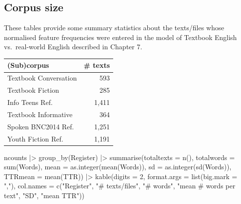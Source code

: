 \documentclass[
  letterpaper,
  DIV=11,
  numbers=noendperiod]{scrreprt}
\newenvironment{Shaded}{\begin{snugshade}}{\end{snugshade}}
\newcommand{\AttributeTok}[1]{\textcolor[rgb]{0.40,0.45,0.13}{#1}}
\newcommand{\DecValTok}[1]{\textcolor[rgb]{0.68,0.00,0.00}{#1}}
\newcommand{\FunctionTok}[1]{\textcolor[rgb]{0.28,0.35,0.67}{#1}}
\newcommand{\NormalTok}[1]{\textcolor[rgb]{0.00,0.23,0.31}{#1}}
\newcommand{\SpecialCharTok}[1]{\textcolor[rgb]{0.37,0.37,0.37}{#1}}
\newcommand{\StringTok}[1]{\textcolor[rgb]{0.13,0.47,0.30}{#1}}
\begin{document}
\subsection{Corpus size}\label{corpus-size-1}

These tables provide some summary statistics about the texts/files whose
normalised feature frequencies were entered in the model of Textbook
English vs.~real-world English described in Chapter 7.

\begin{Shaded}
\end{Shaded}

\begin{longtable}[]{@{}lr@{}}
\toprule\noalign{}
(Sub)corpus & \# texts \\
\midrule\noalign{}
\endhead
\bottomrule\noalign{}
\endlastfoot
Textbook Conversation & 593 \\
Textbook Fiction & 285 \\
Info Teens Ref. & 1,411 \\
Textbook Informative & 364 \\
Spoken BNC2014 Ref. & 1,251 \\
Youth Fiction Ref. & 1,191 \\
\end{longtable}

\begin{Shaded}
\begin{Highlighting}[]
\NormalTok{ncounts  }\SpecialCharTok{|\textgreater{}}  
  \FunctionTok{group\_by}\NormalTok{(Register) }\SpecialCharTok{|\textgreater{}}  
  \FunctionTok{summarise}\NormalTok{(}\AttributeTok{totaltexts =} \FunctionTok{n}\NormalTok{(), }
            \AttributeTok{totalwords =} \FunctionTok{sum}\NormalTok{(Words), }
            \AttributeTok{mean =} \FunctionTok{as.integer}\NormalTok{(}\FunctionTok{mean}\NormalTok{(Words)), }
            \AttributeTok{sd =} \FunctionTok{as.integer}\NormalTok{(}\FunctionTok{sd}\NormalTok{(Words)), }
            \AttributeTok{TTRmean =} \FunctionTok{mean}\NormalTok{(TTR)) }\SpecialCharTok{|\textgreater{}}  
  \FunctionTok{kable}\NormalTok{(}\AttributeTok{digits =} \DecValTok{2}\NormalTok{, }
        \AttributeTok{format.args =} \FunctionTok{list}\NormalTok{(}\AttributeTok{big.mark =} \StringTok{","}\NormalTok{),}
        \AttributeTok{col.names =} \FunctionTok{c}\NormalTok{(}\StringTok{"Register"}\NormalTok{, }\StringTok{"\# texts/files"}\NormalTok{, }\StringTok{"\# words"}\NormalTok{, }\StringTok{"mean \# words per text"}\NormalTok{, }\StringTok{"SD"}\NormalTok{, }\StringTok{"mean TTR"}\NormalTok{))}
\end{Highlighting}
\end{Shaded}
\end{document}
